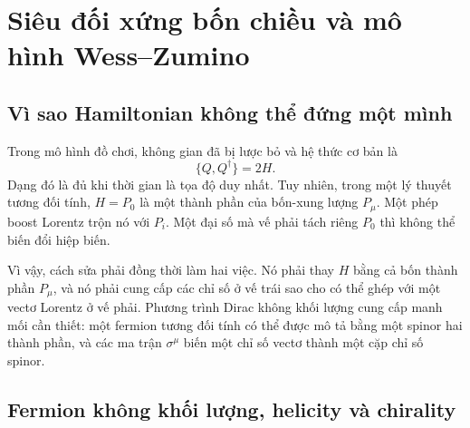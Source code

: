 \chapter{Siêu đối xứng bốn chiều và mô hình Wess--Zumino}


\section{Vì sao Hamiltonian không thể đứng một mình}

Trong mô hình đồ chơi, không gian đã bị lược bỏ và hệ thức cơ bản là
\begin{equation}
\{Q,Q^\dagger\}=2H.
\label{eq:l8-time-only-algebra}
\end{equation}
Dạng đó là đủ khi thời gian là tọa độ duy nhất. Tuy nhiên, trong một lý thuyết tương đối tính, \(H=P_0\) là một thành phần của bốn-xung lượng \(P_\mu\). Một phép boost Lorentz trộn nó với \(P_i\). Một đại số mà vế phải tách riêng \(P_0\) thì không thể biến đổi hiệp biến.

Vì vậy, cách sửa phải đồng thời làm hai việc. Nó phải thay \(H\) bằng cả bốn thành phần \(P_\mu\), và nó phải cung cấp các chỉ số ở vế trái sao cho có thể ghép với một vectơ Lorentz ở vế phải. Phương trình Dirac không khối lượng cung cấp manh mối cần thiết: một fermion tương đối tính có thể được mô tả bằng một spinor hai thành phần, và các ma trận \(\sigma^\mu\) biến một chỉ số vectơ thành một cặp chỉ số spinor.

\section{Fermion không khối lượng, helicity và chirality}

